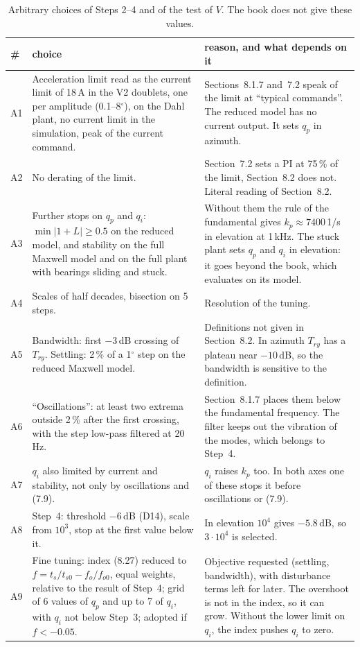 \documentclass[10pt,a4paper]{article}
\numberwithin{equation}{section}
\begin{document}
\begin{table}[H]\centering\footnotesize
\setlength{\tabcolsep}{4pt}\caption{Arbitrary choices of Steps 2--4 and of the test of $V$. The book does not give these values.}\label{tab:arbitrary}
\begin{tabular}{lL{7.2cm}L{8.4cm}}\toprule
\# & choice & reason, and what depends on it \\ \midrule
A1 & Acceleration limit read as the current limit of 18\,A in the V2 doublets, one per amplitude (0.1--8$^\circ$), on the Dahl plant, no current limit in the simulation, peak of the current command. & Sections~8.1.7 and~7.2 speak of the limit at ``typical commands''. The reduced model has no current output. It sets $q_p$ in azimuth. \\
A2 & No derating of the limit. & Section~7.2 sets a PI at 75\,\% of the limit, Section~8.2 does not. Literal reading of Section~8.2. \\
A3 & Further stops on $q_p$ and $q_i$: $\min|1+L|\geq0.5$ on the reduced model, and stability on the full Maxwell model and on the full plant with bearings sliding and stuck. & Without them the rule of the fundamental gives $k_p\approx7400$\,1/s in elevation at 1\,kHz. The stuck plant sets $q_p$ and $q_i$ in elevation: it goes beyond the book, which evaluates on its model. \\
A4 & Scales of half decades, bisection on 5 steps. & Resolution of the tuning. \\
A5 & Bandwidth: first $-3$\,dB crossing of $T_{ry}$. Settling: 2\,\% of a 1$^\circ$ step on the reduced Maxwell model. & Definitions not given in Section~8.2. In azimuth $T_{ry}$ has a plateau near $-10$\,dB, so the bandwidth is sensitive to the definition. \\
A6 & ``Oscillations'': at least two extrema outside 2\,\% after the first crossing, with the step low-pass filtered at 20\,Hz. & Section~8.1.7 places them below the fundamental frequency. The filter keeps out the vibration of the modes, which belongs to Step~4. \\
A7 & $q_i$ also limited by current and stability, not only by oscillations and (7.9). & $q_i$ raises $k_p$ too. In both axes one of these stops it before oscillations or (7.9). \\
A8 & Step~4: threshold $-6$\,dB (D14), scale from $10^3$, stop at the first value below it. & In elevation $10^4$ gives $-5.8$\,dB, so $3\cdot10^4$ is selected. \\
A9 & Fine tuning: index (8.27) reduced to $f=t_s/t_{s0}-f_o/f_{o0}$, equal weights, relative to the result of Step~4; grid of 6 values of $q_p$ and up to 7 of $q_i$, with $q_i$ not below Step~3; adopted if $f<-0.05$. & Objective requested (settling, bandwidth), with disturbance terms left for later. The overshoot is not in the index, so it can grow. Without the lower limit on $q_i$, the index pushes $q_i$ to zero. \\

\end{tabular}
\end{table}
\end{document}
